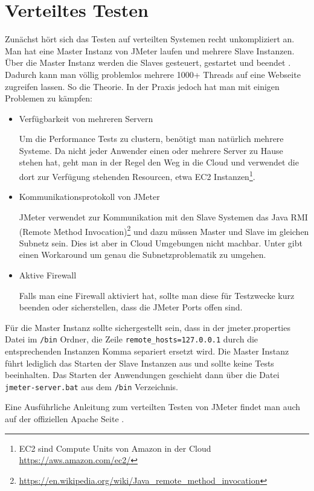 \documentclass[a4paper,12pt]{article}
\newcommand{\codeInLine}[1]{%
\colorbox{graybackgroundColor}{\lstinline{#1}} %
}
\begin{document}
\section{Verteiltes Testen}
Zunächst hört sich das Testen auf verteilten Systemen recht unkompliziert an. Man hat eine Master Instanz von JMeter laufen und mehrere Slave Instanzen. Über die Master Instanz werden die Slaves gesteuert, gestartet und beendet \cite{online:jmetercloud}. Dadurch kann man völlig problemlos mehrere 1000+ Threads auf eine Webseite zugreifen lassen.
So die Theorie. In der Praxis jedoch hat man mit einigen Problemen zu kämpfen:
\begin{itemize}
  \item Verfügbarkeit von mehreren Servern
	
	Um die Performance Tests zu clustern, benötigt man natürlich mehrere Systeme. Da nicht jeder Anwender einen oder mehrere Server zu Hause stehen hat, geht man in der Regel den Weg in die Cloud und verwendet die dort zur Verfügung stehenden Resourcen, etwa EC2 Instanzen\footnote{EC2 sind Compute Units von Amazon in der Cloud \url{https://aws.amazon.com/ec2/}}.
  \item Kommunikationsprotokoll von JMeter
	
	JMeter verwendet zur Kommunikation mit den Slave Systemen das Java RMI (Remote Method Invocation)\footnote{\url{https://en.wikipedia.org/wiki/Java_remote_method_invocation}} und dazu müssen Master und Slave im gleichen Subnetz sein. Dies ist aber in Cloud Umgebungen nicht machbar. Unter \cite{online:jmetercloud} gibt einen Workaround um genau die Subnetzproblematik zu umgehen. 

	\item Aktive Firewall
	
	Falls man eine Firewall aktiviert hat, sollte man diese für Testzwecke kurz beenden oder sicherstellen, dass die JMeter Ports offen sind. 
\end{itemize}

Für die Master Instanz sollte sichergestellt sein, dass in der jmeter.properties Datei im \codeInLine{/bin} Ordner, die Zeile \codeInLine{remote_hosts=127.0.0.1} durch die entsprechenden Instanzen Komma separiert ersetzt wird. Die Master Instanz führt lediglich das Starten der Slave Instanzen aus und sollte keine Tests beeinhalten. Das Starten der Anwendungen geschieht dann über die Datei \codeInLine{jmeter-server.bat} aus dem \codeInLine{/bin} Verzeichnis.

Eine Ausführliche Anleitung zum verteilten Testen von JMeter findet man auch auf der offiziellen Apache Seite \cite{online:apache_distributed}.
\end{document}
